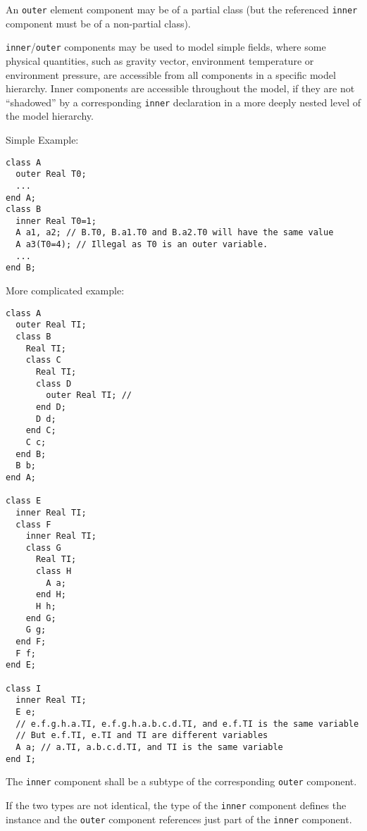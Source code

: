 An \lstinline!outer! element component may be of a partial class (but the
referenced \lstinline!inner! component must be of a non-partial class).

\begin{nonnormative}
\lstinline!inner!/\lstinline!outer! components may be used to model simple fields, where some physical quantities, such as gravity vector, environment temperature or
environment pressure, are accessible from all components in a specific model hierarchy.  Inner components are accessible throughout the model, if they are not ``shadowed''
by a corresponding \lstinline!inner! declaration in a more deeply nested level of the model hierarchy.
\end{nonnormative}

\begin{example}
Simple Example:
\begin{lstlisting}[language=modelica]
class A
  outer Real T0;
  ...
end A;
class B
  inner Real T0=1;
  A a1, a2; // B.T0, B.a1.T0 and B.a2.T0 will have the same value
  A a3(T0=4); // Illegal as T0 is an outer variable.
  ...
end B;
\end{lstlisting}
More complicated example:
\begin{lstlisting}[language=modelica]
class A
  outer Real TI;
  class B
    Real TI;
    class C
      Real TI;
      class D
        outer Real TI; //
      end D;
      D d;
    end C;
    C c;
  end B;
  B b;
end A;

class E
  inner Real TI;
  class F
    inner Real TI;
    class G
      Real TI;
      class H
        A a;
      end H;
      H h;
    end G;
    G g;
  end F;
  F f;
end E;

class I
  inner Real TI;
  E e;
  // e.f.g.h.a.TI, e.f.g.h.a.b.c.d.TI, and e.f.TI is the same variable
  // But e.f.TI, e.TI and TI are different variables
  A a; // a.TI, a.b.c.d.TI, and TI is the same variable
end I;
\end{lstlisting}
\end{example}

The \lstinline!inner! component shall be a subtype of the corresponding \lstinline!outer! component.

\begin{nonnormative}
If the two types are not identical, the type of the \lstinline!inner! component defines the instance and the \lstinline!outer! component references just part of the
\lstinline!inner! component.
\end{nonnormative}

